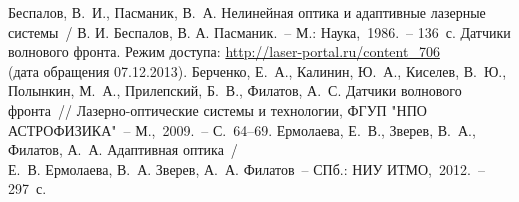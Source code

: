 \documentclass[pscyr,titlepage]{hedreport}
\begin{document}
\pagebreak %
\renewcommand{\bibname}{Список литературы}

\begin{thebibliography}{9}
   Беспалов, В.~И., Пасманик, В.~А. Нелинейная оптика и адаптивные
    лазерные системы~/ В. И. Беспалов, В. А. Пасманик.~-- М.: Наука,~1986.~--
    136~с.
   Датчики волнового фронта. Режим доступа:
    \url{http://laser-portal.ru/content_706}\\
    (дата обращения 07.12.2013).
   Берченко, Е.~А., Калинин, Ю.~А., Киселев, В.~Ю., Полынкин, М.~А.,
    Прилепский, Б.~В., Филатов, А.~С. Датчики волнового фронта~//
    Лазерно-оптические системы и технологии, ФГУП "НПО АСТРОФИЗИКА"~--
    М.,~2009.~-- С.~64--69. 
   Ермолаева, Е.~В., Зверев, В.~А., Филатов, А.~А. Адаптивная
    оптика~/\\ Е.~В. Ермолаева, В.~А. Зверев, А.~А. Филатов~-- СПб.: НИУ
    ИТМО,~2012.~-- 297~с.
\end{thebibliography}
\end{document}
